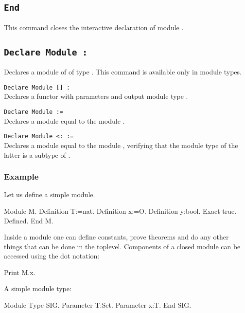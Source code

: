 \subsection{\tt End {\ident}}
This command closes the interactive declaration of module {\ident}.

\subsection{\tt Declare Module {\ident} : \modtype}
Declares a module of {\ident} of type {\modtype}. This command is available
only in module types. 

\begin{Variants}
\item{\tt Declare Module {\ident} [\modbindings] \verb.:. \modtype}\\
  Declares a functor with parameters {\modbindings} and output module
  type \modtype.
\item{\tt Declare Module {\ident} := {\qualid}}\\
  Declares a module equal to the module {\qualid}.
\item{\tt Declare Module {\ident} \verb.<:. {\modtype} := {\qualid}}\\
  Declares a module equal to the module {\qualid}, verifying that the
  module type of the latter is a subtype of {\modtype}.
\end{Variants}


\subsubsection{Example}

Let us define a simple module.
\begin{coq_example}
Module M.
  Definition T:=nat.
  Definition x:=O.
  Definition y:bool.
    Exact true.
  Defined.
End M.
\end{coq_example}

\noindent
Inside a module one can define constants, prove theorems and do any
other things that can be done in the toplevel. Components of a closed
module can be accessed using the dot notation:

\begin{coq_example}
Print M.x.
\end{coq_example}
A simple module type:
\begin{coq_example}
Module Type SIG.
  Parameter T:Set.
  Parameter x:T.
End SIG.
\end{coq_example}


